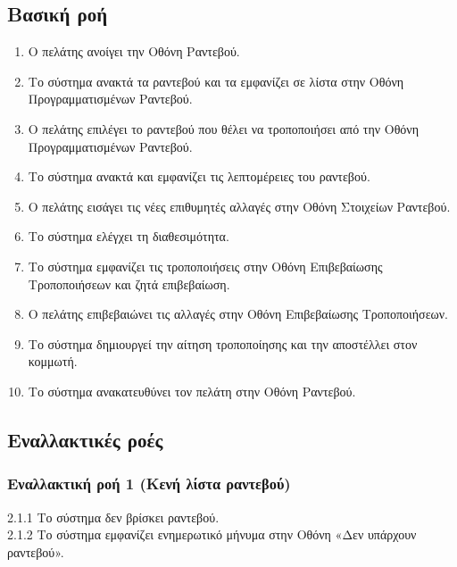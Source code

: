 \documentclass[12pt,a4paper,twoside]{book}
\begin{document}
\subsection{Βασική ροή}
\begin{enumerate}
    \item Ο πελάτης ανοίγει την Οθόνη Ραντεβού.
    \item Το σύστημα ανακτά τα ραντεβού και τα εμφανίζει σε λίστα στην Οθόνη Προγραμματισμένων Ραντεβού.
    \item Ο πελάτης επιλέγει το ραντεβού που θέλει να τροποποιήσει από την Οθόνη Προγραμματισμένων Ραντεβού.
    \item Το σύστημα ανακτά και εμφανίζει τις λεπτομέρειες του ραντεβού.
    \item Ο πελάτης εισάγει τις νέες επιθυμητές αλλαγές στην Οθόνη Στοιχείων Ραντεβού.
    \item Το σύστημα ελέγχει τη διαθεσιμότητα.
    \item Το σύστημα εμφανίζει τις τροποποιήσεις στην Οθόνη Επιβεβαίωσης Τροποποιήσεων και ζητά επιβεβαίωση.
    \item Ο πελάτης επιβεβαιώνει τις αλλαγές στην Οθόνη Επιβεβαίωσης Τροποποιήσεων.
    \item Το σύστημα δημιουργεί την αίτηση τροποποίησης και την αποστέλλει στον κομμωτή.
    \item Το σύστημα ανακατευθύνει τον πελάτη στην Οθόνη Ραντεβού.
\end{enumerate}

\subsection{Εναλλακτικές ροές}

\subsubsection*{Εναλλακτική ροή 1 (Κενή λίστα ραντεβού)}
2.1.1 Το σύστημα δεν βρίσκει ραντεβού.\\
\hspace*{\parindent}2.1.2 Το σύστημα εμφανίζει ενημερωτικό μήνυμα στην Οθόνη «Δεν υπάρχουν ραντεβού».
\end{document}
